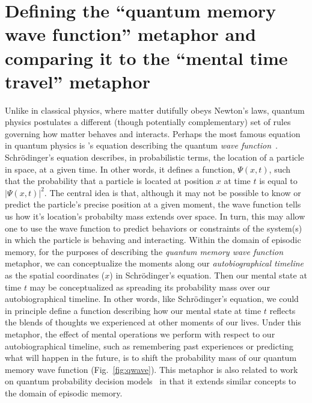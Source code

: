 \documentclass{article}
\begin{document}
\section*{Defining the ``quantum memory wave function'' metaphor and comparing it to the ``mental time travel'' metaphor}
Unlike in classical physics, where matter dutifully obeys Newton's laws, quantum physics postulates a different (though potentially complementary) set of rules governing how matter behaves and interacts.  Perhaps the most famous equation in quantum physics is \cite{Schr26}'s equation describing the quantum \textit{wave function}~\citep[this finding was also inspired by][]{deBr24}.  Schr\"{o}dinger's equation describes, in probabilistic terms, the location of a particle in space, at a given time.  In other words, it defines a function, $\Psi(x, t)$, such that the probability that a particle is located at position $x$ at time $t$ is equal to $|\Psi(x, t)|^2$.  The central idea is that, although it may not be possible to know or predict the particle's precise position at a given moment, the wave function tells us how it's location's probabilty mass extends over space.  In turn, this may allow one to use the wave function to predict behaviors or constraints of the system(s) in which the particle is behaving and interacting.  Within the domain of episodic memory, for the purposes of describing the \textit{quantum memory wave function} metaphor, we can conceptualize the moments along our \textit{autobiographical timeline} as the spatial coordinates ($x$) in Schr\"{o}dinger's equation.  Then our mental state at time $t$ may be conceptualized as spreading its probability mass over our autobiographical timeline.  In other words, like Schr\"{o}dinger's equation, we could in principle define a function describing how our mental state at time $t$ reflects the blends of thoughts we experienced at other moments of our lives.  Under this metaphor, the effect of mental operations we perform with respect to our autobiographical timeline, such as remembering past experiences or predicting what will happen in the future, is to shift the probability mass of our quantum memory wave function (Fig.~\ref{fig:qwave}).  This metaphor is also related to work on quantum probability decision models~\citep[e.g.,][]{KhreEtal18} in that it extends similar concepts to the domain of episodic memory.
\end{document}
